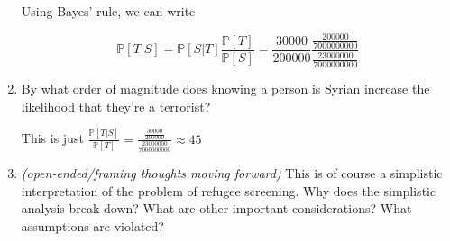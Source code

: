 \documentclass{article}
\newenvironment{solution}{\color{red}}{\color{black}}
\begin{document}
\begin{enumerate}
\begin{solution}
Using Bayes' rule, we can write

\[ \mathbb{P}[T | S] = \mathbb{P}[S | T] \frac{\mathbb{P}[T]}{\mathbb{P}[S]} = \frac{30000}{200000} \frac{\frac{200000}{7000000000}}{\frac{23000000}{7000000000}} \]
\end{solution}

\item By what order of magnitude does knowing a person is Syrian increase the likelihood that they're a terrorist?

\begin{solution}
This is just $\frac{\mathbb{P}[T | S]}{\mathbb{P}[T]} = \frac{\frac{30000}{200000}}{\frac{23000000}{7000000000}} \approx 45$
\end{solution}

\item \textit{(open-ended/framing thoughts moving forward)} This is of course a simplistic interpretation of the problem of refugee screening. Why does the simplistic analysis break down? What are other important considerations? What assumptions are violated?
\end{enumerate}
\end{document}
